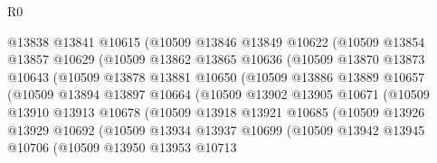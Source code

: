 \begin{lexlean}{R0}
\begin{coremodule}
                        @13838
                        @13841
                        @10615
                        (@10509
                          @13846
                          @13849
                          @10622
                          (@10509
                            @13854
                            @13857
                            @10629
                            (@10509
                              @13862
                              @13865
                              @10636
                              (@10509
                                @13870
                                @13873
                                @10643
                                (@10509
                                  @13878
                                  @13881
                                  @10650
                                  (@10509
                                    @13886
                                    @13889
                                    @10657
                                    (@10509
                                      @13894
                                      @13897
                                      @10664
                                      (@10509
                                        @13902
                                        @13905
                                        @10671
                                        (@10509
                                          @13910
                                          @13913
                                          @10678
                                          (@10509
                                            @13918
                                            @13921
                                            @10685
                                            (@10509
                                              @13926
                                              @13929
                                              @10692
                                              (@10509
                                                @13934
                                                @13937
                                                @10699
                                                (@10509
                                                  @13942
                                                  @13945
                                                  @10706
                                                  (@10509
                                                    @13950
                                                    @13953
                                                    @10713

\end{coremodule}
\end{lexlean}
